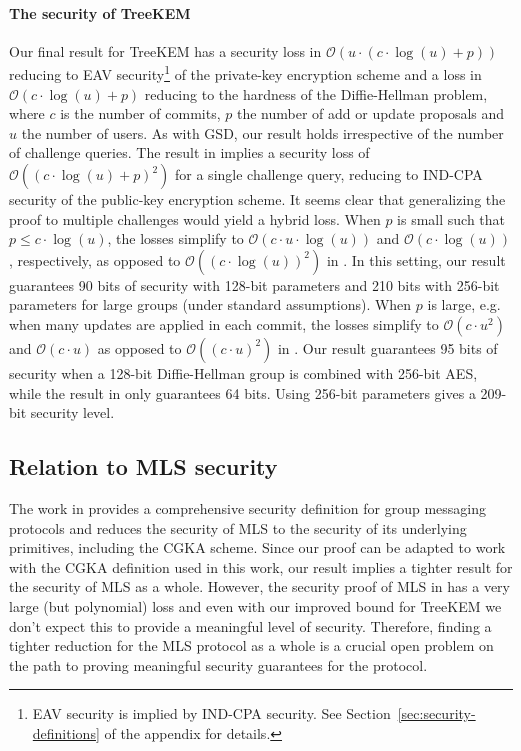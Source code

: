 \paragraph{The security of TreeKEM} Our final result for TreeKEM has a security loss in $\mathcal{O}(u \cdot (c \cdot \log(u) + p))$ reducing to EAV security\footnote{EAV security is implied by IND-CPA security. See Section~\ref{sec:security-definitions} of the appendix for details.} of the private-key encryption scheme  and a loss in $\mathcal{O}(c \cdot \log(u) + p)$ reducing to the hardness of the Diffie-Hellman problem, where $c$ is the number of commits, $p$ the number of add or update proposals and $u$ the number of users. As with GSD, our result holds irrespective of the number of challenge queries. The result in \cite{ttkem} implies a security loss of $\mathcal{O}((c \cdot \log(u) + p)^2)$ for a single challenge query, reducing to IND-CPA security of the public-key encryption scheme. It seems clear that generalizing the proof to multiple challenges would yield a hybrid loss.
When $p$ is small such that $p \le c \cdot \log(u)$, the losses simplify to $\mathcal{O}(c \cdot u \cdot \log(u))$ and $\mathcal{O}(c \cdot \log(u))$, respectively, as opposed to $\mathcal{O}((c \cdot \log(u))^2)$ in \cite{ttkem}. In this setting, our result guarantees 90 bits of security with 128-bit parameters and 210 bits with 256-bit parameters for large groups (under standard assumptions).
When $p$ is large, e.g. when many updates are applied in each commit, the losses simplify to $\mathcal{O}(c \cdot u^2)$ and $\mathcal{O}(c \cdot u)$ as opposed to $\mathcal{O}((c \cdot u)^2)$ in \cite{ttkem}. Our result guarantees 95 bits of security when a 128-bit Diffie-Hellman group is combined with 256-bit AES, while the result in \cite{ttkem} only guarantees 64 bits. Using 256-bit parameters gives a 209-bit security level.

\subsection{Relation to MLS security}
The work in \cite{modular-group-messaging} provides a comprehensive security definition for group messaging protocols and reduces the security of MLS to the security of its underlying primitives, including the CGKA scheme. Since our proof can be adapted to work with the CGKA definition used in this work, our result implies a tighter result for the security of MLS as a whole. However, the security proof of MLS in \cite{modular-group-messaging} has a very large (but polynomial) loss and even with our improved bound for TreeKEM we don't expect this to provide a meaningful level of security. Therefore, finding a tighter reduction for the MLS protocol as a whole is a crucial open problem on the path to proving meaningful security guarantees for the protocol.

